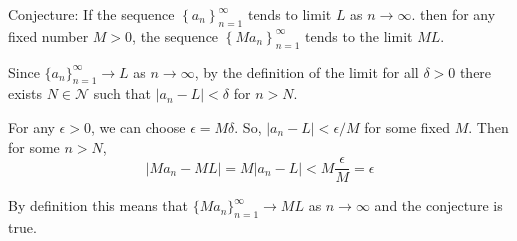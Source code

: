 \documentclass[a4paper]{article}
\begin{document}
Conjecture: If the sequence $\left\{ a_n \right\}_{n=1}^{\infty}$ tends to limit $L$ as $n \to
\infty$. then for any fixed number $M > 0$, the sequence $\left\{ Ma_n \right\}_{n=1}^{\infty}$
tends to the limit $ML$.

Since $\{a_n\}_{n=1}^{\infty} \to L$ as $n \to \infty$, by the definition of the limit for all $\delta
> 0$ there exists $N \in \mathcal{N}$ such that $|a_n - L| < \delta$ for $n > N$.

For any $\epsilon > 0$, we can choose $\epsilon = M\delta$. So, $|a_n - L| < \epsilon / M$ for some
fixed $M$.
Then for some $n > N$,
\begin{equation}
  |Ma_n - ML| = M|a_n - L| < M \frac{\epsilon}{M} = \epsilon
\end{equation}

By definition this means that $\{Ma_n\}_{n=1}^{\infty} \to ML$ as $n \to \infty$ and the conjecture
is true.
\end{document}
